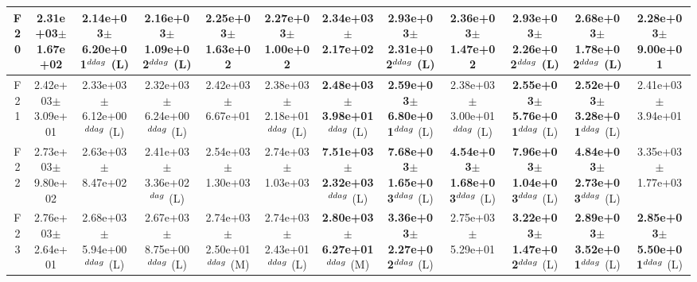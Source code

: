 \begin{table}[!t]
\begin{tabular}{c|ccccccccccc}
F20  & 2.31e+03$\pm$1.67e+02  & 2.14e+03$\pm$6.20e+01$^{\\ddag}$ (L)  & 2.16e+03$\pm$1.09e+02$^{\\ddag}$ (L)  & 2.25e+03$\pm$1.63e+02   & 2.27e+03$\pm$1.00e+02   & 2.34e+03$\pm$2.17e+02   & \textbf{2.93e+03$\pm$2.31e+02}$^{\\ddag}$ (L)  & 2.36e+03$\pm$1.47e+02   & \textbf{2.93e+03$\pm$2.26e+02}$^{\\ddag}$ (L)  & \textbf{2.68e+03$\pm$1.78e+02}$^{\\ddag}$ (L)  & 2.28e+03$\pm$9.00e+01  \\ \hline
F21  & 2.42e+03$\pm$3.09e+01  & 2.33e+03$\pm$6.12e+00$^{\\ddag}$ (L)  & 2.32e+03$\pm$6.24e+00$^{\\ddag}$ (L)  & 2.42e+03$\pm$6.67e+01   & 2.38e+03$\pm$2.18e+01$^{\\ddag}$ (L)  & \textbf{2.48e+03$\pm$3.98e+01}$^{\\ddag}$ (L)  & \textbf{2.59e+03$\pm$6.80e+01}$^{\\ddag}$ (L)  & 2.38e+03$\pm$3.00e+01$^{\\ddag}$ (L)  & \textbf{2.55e+03$\pm$5.76e+01}$^{\\ddag}$ (L)  & \textbf{2.52e+03$\pm$3.28e+01}$^{\\ddag}$ (L)  & 2.41e+03$\pm$3.94e+01  \\ \hline
F22  & 2.73e+03$\pm$9.80e+02  & 2.63e+03$\pm$8.47e+02   & 2.41e+03$\pm$3.36e+02$^{\\dag}$ (L)  & 2.54e+03$\pm$1.30e+03   & 2.74e+03$\pm$1.03e+03   & \textbf{7.51e+03$\pm$2.32e+03}$^{\\ddag}$ (L)  & \textbf{7.68e+03$\pm$1.65e+03}$^{\\ddag}$ (L)  & \textbf{4.54e+03$\pm$1.68e+03}$^{\\ddag}$ (L)  & \textbf{7.96e+03$\pm$1.04e+03}$^{\\ddag}$ (L)  & \textbf{4.84e+03$\pm$2.73e+03}$^{\\ddag}$ (L)  & 3.35e+03$\pm$1.77e+03  \\ \hline
F23  & 2.76e+03$\pm$2.64e+01  & 2.68e+03$\pm$5.94e+00$^{\\ddag}$ (L)  & 2.67e+03$\pm$8.75e+00$^{\\ddag}$ (L)  & 2.74e+03$\pm$2.50e+01$^{\\ddag}$ (M)  & 2.74e+03$\pm$2.43e+01$^{\\ddag}$ (L)  & \textbf{2.80e+03$\pm$6.27e+01}$^{\\ddag}$ (M)  & \textbf{3.36e+03$\pm$2.27e+02}$^{\\ddag}$ (L)  & 2.75e+03$\pm$5.29e+01   & \textbf{3.22e+03$\pm$1.47e+02}$^{\\ddag}$ (L)  & \textbf{2.89e+03$\pm$3.52e+01}$^{\\ddag}$ (L)  & \textbf{2.85e+03$\pm$5.50e+01}$^{\\ddag}$ (L) \\ \hline

\end{tabular}
\end{table}
